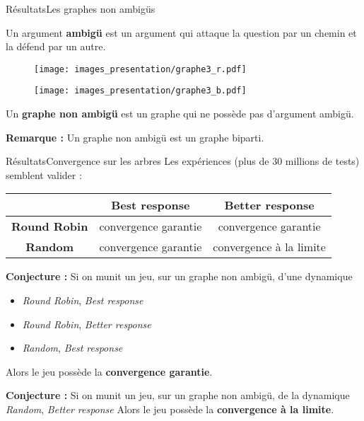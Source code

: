 \documentclass{beamer}
\begin{document}
  \begin{frame}{Résultats}{Les graphes non ambigüs}

    Un argument \textbf{ambigü} est un argument qui attaque la question par un chemin et la défend par un autre.
    \begin{overprint}

      \begin{figure}
        \centering
      \texttt{[image: images\_presentation/graphe3\_r.pdf]}
      \end{figure}
      \begin{figure}
        \centering
      \texttt{[image: images\_presentation/graphe3\_b.pdf]}
    \end{figure}
    \end{overprint}

    Un \textbf{graphe non ambigü} est un graphe qui ne possède pas d'argument ambigü.

\vspace{2em}
    \textbf{Remarque :} Un graphe non ambigü est un graphe biparti.
  \end{frame}

  \begin{frame}{Résultats}{Convergence sur les arbres}
    Les expériences (plus de 30 millions de tests) semblent valider :
    \begin{tabular}{|c|c|c|}
      \hline
      & \textbf{Best response} & \textbf{Better response} \\
      \hline
      \textbf{Round Robin} & convergence garantie & convergence garantie \\
      \hline
      \textbf{Random} & convergence garantie & convergence à la limite \\
      \hline
    \end{tabular}
    \vspace{1em}

    \textbf{Conjecture :} Si on munit un jeu, sur un graphe non ambigü, d'une dynamique
    \begin{itemize}
      \item \emph{Round Robin}, \emph{Best response}
      \item \emph{Round Robin}, \emph{Better response}
      \item \emph{Random}, \emph{Best response}
    \end{itemize}
    Alors le jeu possède la \textbf{convergence garantie}.
    \vspace{1em}

    \textbf{Conjecture :} Si on munit un jeu, sur un graphe non ambigü, de la dynamique \emph{Random}, \emph{Better response}
    Alors le jeu possède la \textbf{convergence à la limite}.
  \end{frame}
\end{document}
